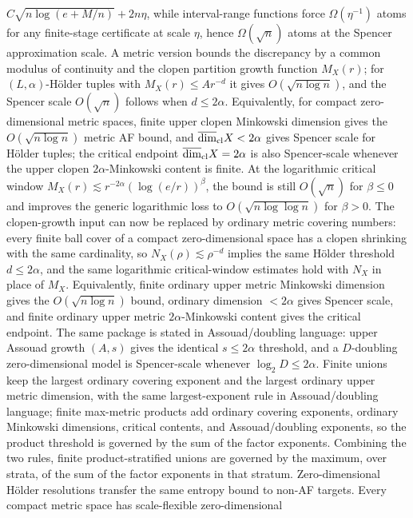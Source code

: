 \documentclass[11pt]{article}
\begin{document}
\(C\sqrt{n\log(e+M/n)}+2n\eta\), while interval-range functions force
\(\Omega(\eta^{-1})\) atoms for any finite-stage certificate at scale \(\eta\),
hence \(\Omega(\sqrt n)\) atoms at the Spencer approximation scale.  A metric
version bounds the discrepancy by a common modulus of continuity and the clopen
partition growth function \(M_X(r)\); for \((L,\alpha)\)-Hölder tuples with
\(M_X(r)\le Ar^{-d}\) it gives \(O(\sqrt{n\log n})\), and the Spencer scale
\(O(\sqrt n)\) follows when \(d\le2\alpha\).  Equivalently, for compact
zero-dimensional metric spaces, finite upper clopen Minkowski dimension gives
the \(O(\sqrt{n\log n})\) metric AF bound, and
\(\overline{\dim}_{\rm cl}X<2\alpha\) gives Spencer scale for Hölder tuples;
the critical endpoint \(\overline{\dim}_{\rm cl}X=2\alpha\) is also
Spencer-scale whenever the upper clopen \(2\alpha\)-Minkowski content is finite.
At the logarithmic critical window
\(M_X(r)\lesssim r^{-2\alpha}(\log(e/r))^\beta\), the bound is still
\(O(\sqrt n)\) for \(\beta\le0\) and improves the generic logarithmic loss to
\(O(\sqrt{n\log\log n})\) for \(\beta>0\).
The clopen-growth input can now be replaced by ordinary metric covering
numbers: every finite ball cover of a compact zero-dimensional space has a
clopen shrinking with the same cardinality, so \(N_X(\rho)\lesssim\rho^{-d}\)
implies the same H\"older threshold \(d\le2\alpha\), and the same logarithmic
critical-window estimates hold with \(N_X\) in place of \(M_X\).
Equivalently, finite ordinary upper metric Minkowski dimension gives the
\(O(\sqrt{n\log n})\) bound, ordinary dimension \(<2\alpha\) gives Spencer
scale, and finite ordinary upper metric \(2\alpha\)-Minkowski content gives the
critical endpoint.
The same package is stated in Assouad/doubling language: upper Assouad growth
\((A,s)\) gives the identical \(s\le2\alpha\) threshold, and a \(D\)-doubling
zero-dimensional model is Spencer-scale whenever \(\log_2D\le2\alpha\).
Finite unions keep the largest ordinary covering exponent and the largest
ordinary upper metric dimension, with the same largest-exponent rule in
Assouad/doubling language; finite max-metric products add ordinary covering
exponents, ordinary Minkowski dimensions, critical contents, and
Assouad/doubling exponents, so the product threshold is governed by the sum of
the factor exponents.  Combining the two rules, finite product-stratified
unions are governed by the maximum, over strata, of the sum of the factor
exponents in that stratum.
Zero-dimensional H\"older resolutions transfer the same entropy bound to
non-AF targets.  Every compact metric space has scale-flexible zero-dimensional
\end{document}
